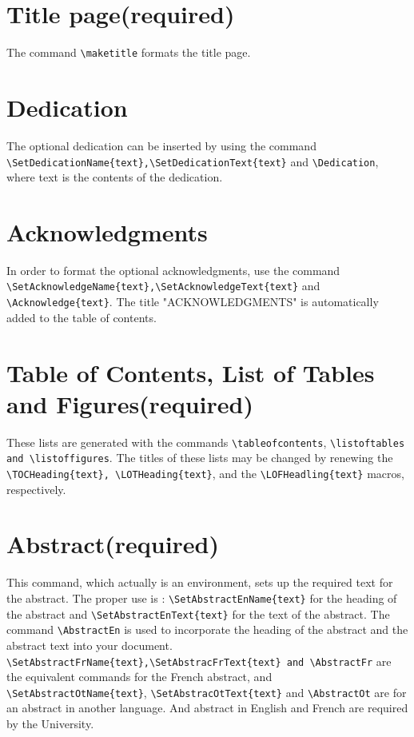 \documentclass[12pt,Bold,letterpaper,TexShade]{mcgilletdclass}
\numberwithin{equation}{section}
\begin{document}
\section{Title page(required)}
The command \verb=\maketitle= formats the title page. 
\section{Dedication}
The optional dedication can be inserted by using the command 
\verb=\SetDedicationName{text},\SetDedicationText{text}= and
\verb=\Dedication=, where text is the contents of the dedication.
\section{Acknowledgments}
In order to format the optional acknowledgments, use the command 
\verb=\SetAcknowledgeName{text},\SetAcknowledgeText{text}= and
\verb=\Acknowledge{text}=. The title "ACKNOWLEDGMENTS" is automatically
added to the table of contents. 
\section{Table of Contents, List of Tables and Figures(required)}
These lists are generated with the commands \verb=\tableofcontents=,
\verb=\listoftables and \listoffigures=. The titles of these lists may
be changed by renewing the \verb=\TOCHeading{text}, \LOTHeading{text}=, and
the \verb=\LOFHeadling{text}= macros, respectively.
\section{Abstract(required)}
This command, which actually is an environment, sets up the required 
text for the abstract. The proper use is : \verb=\SetAbstractEnName{text}=
for the heading of the abstract and \verb=\SetAbstractEnText{text}= for the 
text of the abstract. The command \verb=\AbstractEn= is used to incorporate 
the heading of the abstract and the abstract text into your document.
\verb=\SetAbstractFrName{text},\SetAbstracFrText{text} and \AbstractFr= are the
equivalent commands for the French abstract, and \verb=\SetAbstractOtName{text}=, 
\verb=\SetAbstracOtText{text}= and \verb=\AbstractOt= are for an abstract in 
another language. And abstract in English and French are required by the University.
\end{document}

